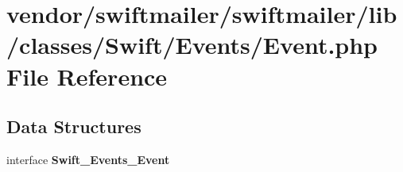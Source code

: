 \section{vendor/swiftmailer/swiftmailer/lib/classes/\+Swift/\+Events/\+Event.php File Reference}
\label{vendor_2swiftmailer_2swiftmailer_2lib_2classes_2_swift_2_events_2_event_8php}
\subsection*{Data Structures}
\begin{DoxyCompactItemize}
\item 
interface {\bf Swift\+\_\+\+Events\+\_\+\+Event}
\end{DoxyCompactItemize}
